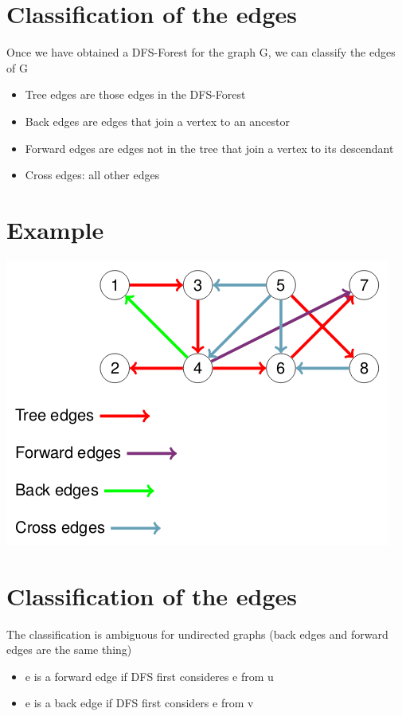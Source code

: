 \documentclass{article}[18pt]
\begin{document}
\section{Classification of the edges}
Once we have obtained a DFS-Forest for the graph G, we can classify the edges of G
\begin{itemize}
	\item Tree edges are those edges in the DFS-Forest
	\item Back edges are edges that join a vertex to an ancestor 
	\item Forward edges are edges not in the tree that join a vertex to its descendant
	\item Cross edges: all other edges
\end{itemize}
\section{Example}
\begin{center}
	\includegraphics[scale=0.7]{Example2}
\end{center}
\section{Classification of the edges}
The classification is ambiguous for undirected graphs (back edges and forward edges are the same thing)
\begin{itemize}
	\item e is a forward edge if DFS first consideres e from u
	\item e is a back edge if DFS first considers e from v
\end{itemize}
\end{document}
